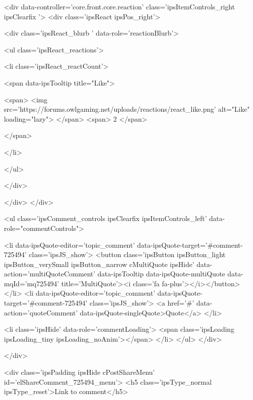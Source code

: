 	<div data-controller='core.front.core.reaction' class='ipsItemControls_right ipsClearfix '>	
		<div class='ipsReact ipsPos_right'>
			
				
				<div class='ipsReact_blurb ' data-role='reactionBlurb'>
					
						

	
	<ul class='ipsReact_reactions'>
		
		
			
				
				<li class='ipsReact_reactCount'>
					
						<span data-ipsTooltip title="Like">
					
							<span>
								<img src='https://forums.owlgaming.net/uploads/reactions/react_like.png' alt="Like" loading="lazy">
							</span>
							<span>
								2
							</span>
					
						</span>
					
				</li>
			
		
	</ul>

					
				</div>
			
			
			
		</div>
	</div>

					
				
				<ul class='ipsComment_controls ipsClearfix ipsItemControls_left' data-role="commentControls">
					
						
							<li data-ipsQuote-editor='topic_comment' data-ipsQuote-target='#comment-725494' class='ipsJS_show'>
								<button class='ipsButton ipsButton_light ipsButton_verySmall ipsButton_narrow cMultiQuote ipsHide' data-action='multiQuoteComment' data-ipsTooltip data-ipsQuote-multiQuote data-mqId='mq725494' title='MultiQuote'><i class='fa fa-plus'></i></button>
							</li>
							<li data-ipsQuote-editor='topic_comment' data-ipsQuote-target='#comment-725494' class='ipsJS_show'>
								<a href='#' data-action='quoteComment' data-ipsQuote-singleQuote>Quote</a>
							</li>
						
						
						
					
					<li class='ipsHide' data-role='commentLoading'>
						<span class='ipsLoading ipsLoading_tiny ipsLoading_noAnim'></span>
					</li>
				</ul>
			</div>
		

		
			

		
	</div>

	

	



<div class='ipsPadding ipsHide cPostShareMenu' id='elShareComment_725494_menu'>
	<h5 class='ipsType_normal ipsType_reset'>Link to comment</h5>
	

